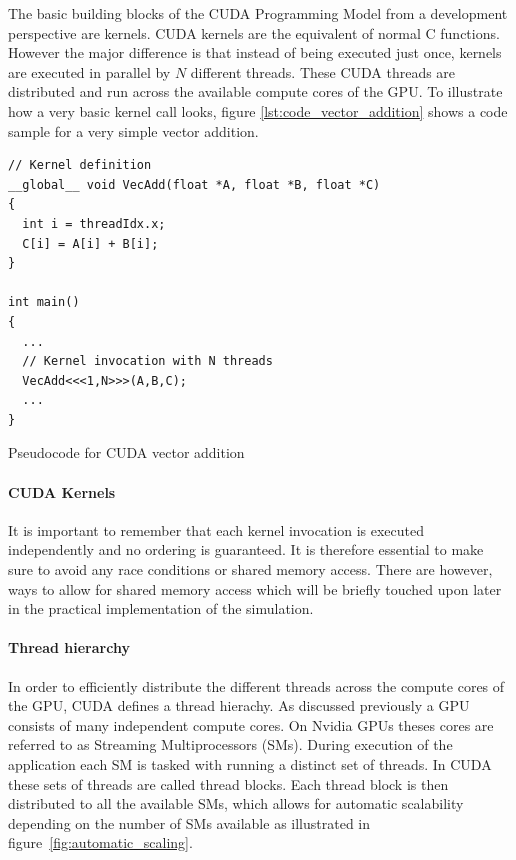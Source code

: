 \documentclass[a4paper,11pt]{kth-mag}
\begin{document}
The basic building blocks of the CUDA Programming Model from a development perspective are kernels. CUDA kernels are the equivalent of normal C functions. However the major difference is that instead of being executed just once, kernels are executed in parallel by $N$ different threads. These CUDA threads are distributed and run across the available compute cores of the GPU. To illustrate how a very basic kernel call looks, figure \ref{lst:code_vector_addition} shows a code sample for a very simple vector addition.

\begin{listing}[!htbp]
  \centering
  \begin{verbatim}
// Kernel definition
__global__ void VecAdd(float *A, float *B, float *C)
{
  int i = threadIdx.x;
  C[i] = A[i] + B[i];
}

int main()
{
  ...
  // Kernel invocation with N threads
  VecAdd<<<1,N>>>(A,B,C);
  ...
}
  \end{verbatim}
  \caption{Pseudocode for CUDA vector addition}
  \label{lst:code_vector_addition}
\end{listing}

\paragraph{CUDA Kernels}

It is important to remember that each kernel invocation is executed independently and no ordering is guaranteed. It is therefore essential to make sure to avoid any race conditions or shared memory access. There are however, ways to allow for shared memory access which will be briefly touched upon later in the practical implementation of the simulation.

\paragraph{Thread hierarchy}

In order to efficiently distribute the different threads across the compute cores of the GPU, CUDA defines a thread hierachy. As discussed previously a GPU consists of many independent compute cores. On Nvidia GPUs theses cores are referred to as Streaming Multiprocessors (SMs). During execution of the application each SM is tasked with running a distinct set of threads. In CUDA these sets of threads are called thread blocks. Each thread block is then distributed to all the available SMs, which allows for automatic scalability depending on the number of SMs available  as illustrated in figure~\ref{fig:automatic_scaling}.
\end{document}
